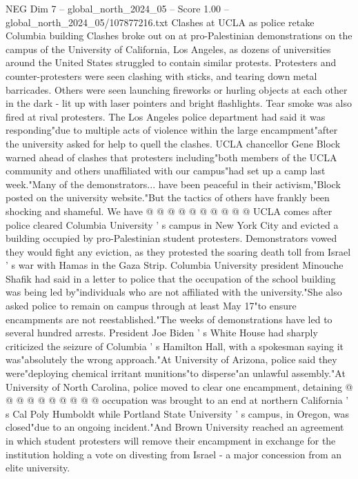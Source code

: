 \begin{textsample}{NEG Dim 7 – global\_north\_2024\_05 – Score 1.00 – global\_north\_2024\_05/107877216.txt}  \label{ex:f7_neg_398}
Clashes at UCLA as police retake Columbia building Clashes broke out on at pro-Palestinian demonstrations on the campus of the University of California, Los Angeles, as dozens of universities around the United States struggled to contain similar protests.
Protesters and counter-protesters were seen clashing with sticks, and tearing down metal barricades.
Others were seen launching fireworks or hurling objects at each other in the dark - lit up with laser pointers and bright flashlights.
Tear smoke was also fired at rival protesters.
The Los Angeles police department had said it was responding"due to multiple acts of violence within the large encampment"after the university asked for help to quell the clashes.
UCLA chancellor Gene Block warned ahead of clashes that protesters including"both members of the UCLA community and others unaffiliated with our campus"had set up a camp last week."Many of the demonstrators... have been peaceful in their activism,"Block posted on the university website."But the tactics of others have frankly been shocking and shameful.
We have @ @ @ @ @ @ @ @ @ @ UCLA comes after police cleared Columbia University ' s campus in New York City and evicted a building occupied by pro-Palestinian student protesters.
Demonstrators vowed they would fight any eviction, as they protested the soaring death toll from Israel ' s war with Hamas in the Gaza Strip.
Columbia University president Minouche Shafik had said in a letter to police that the occupation of the school building was being led by"individuals who are not affiliated with the university."She also asked police to remain on campus through at least May 17"to ensure encampments are not reestablished."The weeks of demonstrations have led to several hundred arrests.
President Joe Biden ' s White House had sharply criticized the seizure of Columbia ' s Hamilton Hall, with a spokesman saying it was"absolutely the wrong approach."At University of Arizona, police said they were"deploying chemical irritant munitions"to disperse"an unlawful assembly."At University of North Carolina, police moved to clear one encampment, detaining @ @ @ @ @ @ @ @ @ @ occupation was brought to an end at northern California ' s Cal Poly Humboldt while Portland State University ' s campus, in Oregon, was closed"due to an ongoing incident."And Brown University reached an agreement in which student protesters will remove their encampment in exchange for the institution holding a vote on divesting from Israel - a major concession from an elite university.

\end{textsample}
